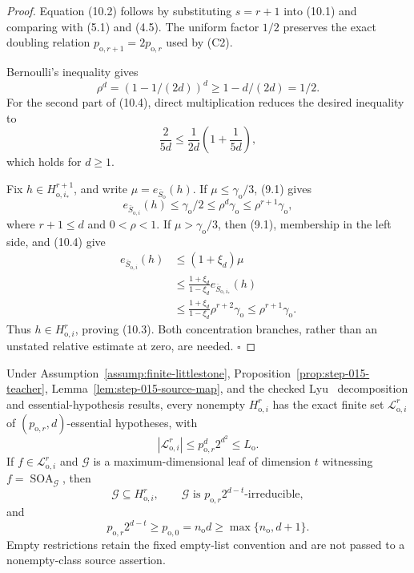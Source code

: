 \begin{proof}
Equation (10.2) follows by substituting \(s=r+1\) into (10.1) and comparing
with (5.1) and (4.5). The uniform factor \(1/2\) preserves the exact
doubling relation
\(p_{\mathrm o,r+1}=2p_{\mathrm o,r}\) used by (C2).

Bernoulli's inequality gives
\[
\rho^d=(1-1/(2d))^d\ge1-d/(2d)=1/2.
\]
For the second part of (10.4), direct multiplication reduces the desired
inequality to
\[
\frac{2}{5d}\le\frac1{2d}\left(1+\frac1{5d}\right),
\]
which holds for \(d\ge1\).

Fix \(h\in H_{\mathrm o,i_*}^{r+1}\), and write
\(\mu=e_{\bar S_{\mathrm o}}(h)\). If
\(\mu\le\gamma_{\mathrm o}/3\), (9.1) gives
\[
e_{\bar S_{\mathrm o,i}}(h)\le\gamma_{\mathrm o}/2
\le\rho^d\gamma_{\mathrm o}
\le\rho^{r+1}\gamma_{\mathrm o},
\]
where \(r+1\le d\) and \(0<\rho<1\). If
\(\mu>\gamma_{\mathrm o}/3\), then (9.1), membership in the left side,
and (10.4) give
\[
\begin{aligned}
e_{\bar S_{\mathrm o,i}}(h)
&\le(1+\xi_d)\mu\\
&\le\frac{1+\xi_d}{1-\xi_d}
e_{\bar S_{\mathrm o,i_*}}(h)\\
&\le\frac{1+\xi_d}{1-\xi_d}
\rho^{r+2}\gamma_{\mathrm o}
\le\rho^{r+1}\gamma_{\mathrm o}.
\end{aligned}
\]
Thus \(h\in H_{\mathrm o,i}^r\), proving (10.3). Both concentration
branches, rather than an unstated relative estimate at zero, are needed.
\(\square\)


\end{proof}

\begin{lemma}\label{lem:step-015-lists}
Under Assumption~\ref{assump:finite-littlestone},
Proposition~\ref{prop:step-015-teacher},
Lemma~\ref{lem:step-015-source-map}, and the checked Lyu~\citep{lyu2025} decomposition and
essential-hypothesis results, every nonempty \(H_{\mathrm o,i}^r\) has the
exact finite set \(\mathcal L_{\mathrm o,i}^r\) of
\((p_{\mathrm o,r},d)\)-essential hypotheses, with
\[
|\mathcal L_{\mathrm o,i}^r|
\le p_{\mathrm o,r}^d2^{d^2}\le L_{\mathrm o}.
\tag{11.1}
\]
If \(f\in\mathcal L_{\mathrm o,i}^r\) and
\(\mathcal G\) is a maximum-dimensional leaf of dimension \(t\) witnessing
\(f=\operatorname{SOA}_{\mathcal G}\), then
\[
\mathcal G\subseteq H_{\mathrm o,i}^r,\qquad
\mathcal G\text{ is }
p_{\mathrm o,r}2^{d-t}\text{-irreducible},
\tag{11.2}
\]
and
\[
p_{\mathrm o,r}2^{d-t}\ge p_{\mathrm o,0}
=n_{\mathrm o}d\ge\max\{n_{\mathrm o},d+1\}.
\tag{11.3}
\]
Empty restrictions retain the fixed empty-list convention and are not
passed to a nonempty-class source assertion.


\end{lemma}

